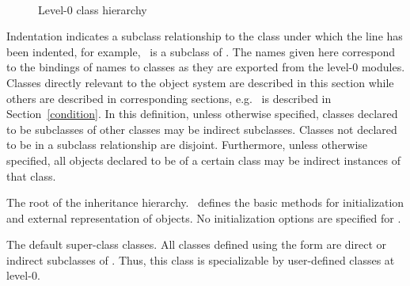 \begin{optDefinition}
\begin{figure}
{\tts\tts\tts{}\\
\tts{} \\
\tts\tts{}\\
\tts\tts{}\\
\tts{} \\
\tts\tts{}\\
}%
\caption{Level-0 class hierarchy}
\label{level-0-class-hierarchy}
\end{figure}
%
Indentation indicates a subclass relationship to the class under which the line
has been indented, for example, \ is a subclass of
.  The names given here correspond to the bindings of names to
classes as they are exported from the level-0 modules.  Classes directly
relevant to the object system are described in this section while others are
described in corresponding sections, e.g. \ is described in
Section~\ref{condition}.
%
In this definition, unless otherwise specified, classes declared to be
subclasses of other classes may be indirect subclasses. Classes not declared to
be in a subclass relationship are disjoint.  Furthermore, unless otherwise
specified, all objects declared to be of a certain class may be indirect
instances of that class.

%
The root of the inheritance hierarchy. \ defines the basic
methods for initialization and external representation of objects.  No
initialization options are specified for .

%
The default super-class classes.  All classes defined using the
 form are direct or indirect subclasses of
.  Thus, this class is specializable by user-defined classes at
level-0.
%
\end{optDefinition}

